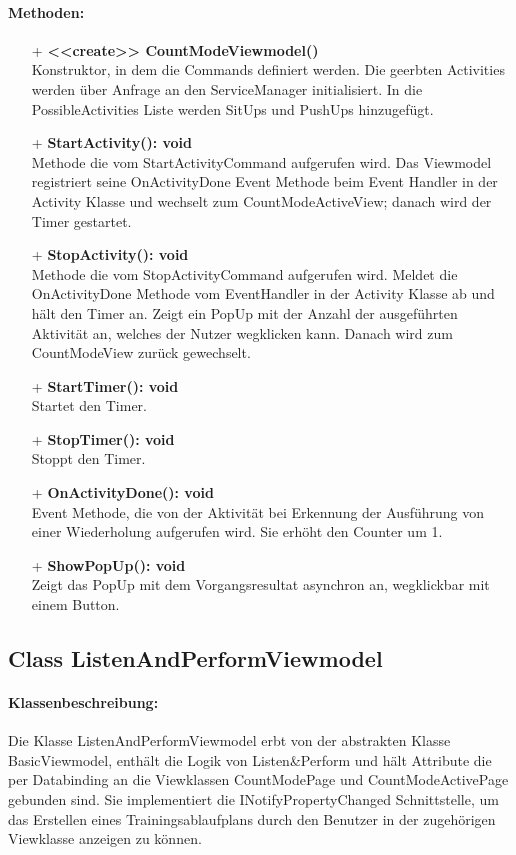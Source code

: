 \documentclass[a4paper,12pt]{article}
\begin{document}
\paragraph{Methoden:}
\begin{itemize}
	\item[+] \textbf{<<create>> CountModeViewmodel()} \\ Konstruktor, in dem die Commands definiert werden. Die geerbten Activities werden über Anfrage an den ServiceManager initialisiert. In die PossibleActivities Liste werden SitUps und PushUps hinzugefügt.
	\item[+] \textbf{StartActivity(): void} \\ Methode die vom StartActivityCommand aufgerufen wird. Das Viewmodel registriert seine OnActivityDone Event Methode beim Event Handler in der Activity Klasse und wechselt zum CountModeActiveView; danach wird der Timer gestartet. 
	\item[+] \textbf{StopActivity(): void} \\ Methode die vom StopActivityCommand aufgerufen wird. Meldet die OnActivityDone Methode vom EventHandler in der Activity Klasse ab und hält den Timer an. Zeigt ein PopUp mit der Anzahl der ausgeführten Aktivität an, welches der Nutzer wegklicken kann. Danach wird zum CountModeView zurück gewechselt. 
	\item[+] \textbf{StartTimer(): void} \\ Startet den Timer. 
	\item[+] \textbf{StopTimer(): void} \\ Stoppt den Timer. 
	\item[+] \textbf{OnActivityDone(): void} \\ Event Methode, die von der Aktivität bei Erkennung der Ausführung von einer Wiederholung aufgerufen wird. Sie erhöht den Counter um 1. 
	\item[+] \textbf{ShowPopUp(): void} \\ Zeigt das PopUp mit dem Vorgangsresultat asynchron an, wegklickbar mit einem Button. 
\end{itemize}

\subsection{Class ListenAndPerformViewmodel}
\paragraph{Klassenbeschreibung:}
Die Klasse ListenAndPerformViewmodel erbt von der abstrakten Klasse BasicViewmodel, enthält die Logik von Listen\&Perform und hält Attribute die per Databinding an die Viewklassen CountModePage und CountModeActivePage gebunden sind.  Sie implementiert die INotifyPropertyChanged Schnittstelle, um das Erstellen eines Trainingsablaufplans durch den Benutzer in der zugehörigen Viewklasse anzeigen zu können.
\end{document}
